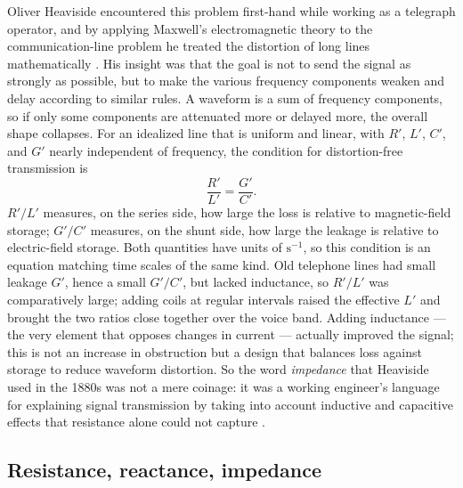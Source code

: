 Oliver Heaviside encountered this problem first-hand while working as a
telegraph operator, and by applying Maxwell's electromagnetic theory to the
communication-line problem he treated the distortion of long lines
mathematically \cite{heaviside_electrical_papers,donaghyspargo2018heaviside}.
His insight was that the goal is not to send the signal as strongly as
possible, but to make the various frequency components weaken and delay
according to similar rules.
A waveform is a sum of frequency components, so if only some components are
attenuated more or delayed more, the overall shape collapses.
For an idealized line that is uniform and linear, with $R'$, $L'$, $C'$, and
$G'$ nearly independent of frequency, the condition for distortion-free
transmission is
\begin{equation}
  \frac{R'}{L'} = \frac{G'}{C'}.
\end{equation}
$R'/L'$ measures, on the series side, how large the loss is relative to
magnetic-field storage; $G'/C'$ measures, on the shunt side, how large the
leakage is relative to electric-field storage.
Both quantities have units of $\mathrm{s}^{-1}$, so this condition is an
equation matching time scales of the same kind.
Old telephone lines had small leakage $G'$, hence a small $G'/C'$, but
lacked inductance, so $R'/L'$ was comparatively large; adding coils at
regular intervals raised the effective $L'$ and brought the two ratios close
together over the voice band.
Adding inductance --- the very element that opposes changes in current ---
actually improved the signal; this is not an increase in obstruction but a
design that balances loss against storage to reduce waveform distortion.
So the word \emph{impedance} that Heaviside used in the 1880s was not a mere
coinage: it was a working engineer's language for explaining signal
transmission by taking into account inductive and capacitive effects that
resistance alone could not capture
\cite{ethw_heaviside,ptb_impedance_history}.

\subsection{Resistance, reactance, impedance}

